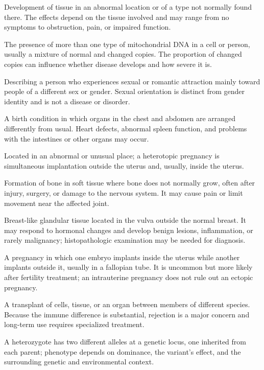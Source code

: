  Development of tissue in an abnormal location or of a type not normally found there. The effects depend on the tissue involved and may range from no symptoms to obstruction, pain, or impaired function.

 The presence of more than one type of mitochondrial DNA in a cell or person, usually a mixture of normal and changed copies. The proportion of changed copies can influence whether disease develops and how severe it is.

 Describing a person who experiences sexual or romantic attraction mainly toward people of a different sex or gender. Sexual orientation is distinct from gender identity and is not a disease or disorder.

 A birth condition in which organs in the chest and abdomen are arranged differently from usual. Heart defects, abnormal spleen function, and problems with the intestines or other organs may occur.

 Located in an abnormal or unusual place; a heterotopic pregnancy is simultaneous implantation outside the uterus and, usually, inside the uterus.

 Formation of bone in soft tissue where bone does not normally grow, often after injury, surgery, or damage to the nervous system. It may cause pain or limit movement near the affected joint.

 Breast-like glandular tissue located in the vulva outside the normal breast. It may respond to hormonal changes and develop benign lesions, inflammation, or rarely malignancy; histopathologic examination may be needed for diagnosis.

 A pregnancy in which one embryo implants inside the uterus while another implants outside it, usually in a fallopian tube. It is uncommon but more likely after fertility treatment; an intrauterine pregnancy does not rule out an ectopic pregnancy.

 A transplant of cells, tissue, or an organ between members of different species. Because the immune difference is substantial, rejection is a major concern and long-term use requires specialized treatment.

 A heterozygote has two different alleles at a genetic locus, one inherited from each parent; phenotype depends on dominance, the variant's effect, and the surrounding genetic and environmental context.

